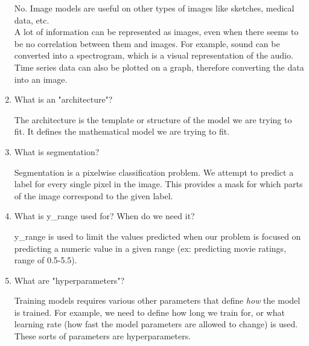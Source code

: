 \documentclass[12pt,a4paper]{article}
\begin{document}
\begin{enumerate}
\smallbreak

No. Image models are useful on other types of images like sketches, medical data, etc. \\
\smallbreak
A lot of information can be represented as images, even when there seems to be no correlation between them and images. For example, sound can be converted into a spectrogram, which is a visual representation of the audio. Time series data can also be plotted on a graph, therefore converting the data into an image.

\bigbreak

\item What is an "architecture"? \\

\smallbreak

The architecture is the template or structure of the model we are trying to fit. It defines the mathematical model we are trying to fit.

\bigbreak

\item What is segmentation? \\

\smallbreak

Segmentation is a pixelwise classification problem. We attempt to predict a label for every single pixel in the image. This provides a mask for which parts of the image correspond to the given label.

\bigbreak

\item What is y\_range used for? When do we need it? \\

\smallbreak

y\_range is used to limit the values predicted when our problem is focused on predicting a numeric value in a given range (ex: predicting movie ratings, range of 0.5-5.5).

\bigbreak

\item What are "hyperparameters"? \\

\smallbreak

Training models requires various other parameters that define \textit{how} the model is trained. For example, we need to define how long we train for, or what learning rate (how fast the model parameters are allowed to change) is used. These sorts of parameters are hyperparameters.

\bigbreak


\end{enumerate}
\end{document}
